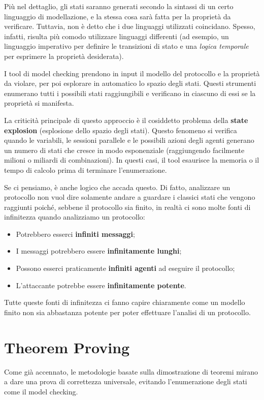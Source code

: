 Più nel dettaglio, gli stati saranno generati secondo la sintassi di un certo linguaggio di modellazione, e la stessa cosa sarà fatta per la proprietà da verificare. Tuttavia, non è detto che i due linguaggi utilizzati coincidano. Spesso, infatti, risulta più comodo utilizzare linguaggi differenti (ad esempio, un linguaggio imperativo per definire le transizioni di stato e una \textit{logica temporale} per esprimere la proprietà desiderata).

I tool di model checking prendono in input il modello del protocollo e la proprietà da violare, per poi esplorare in automatico lo spazio degli stati. Questi strumenti enumerano tutti i possibili stati raggiungibili e verificano in ciascuno di essi se la proprietà si manifesta. 

La criticità principale di questo approccio è il cosiddetto problema della \textbf{state explosion} (esplosione dello spazio degli stati). Questo fenomeno si verifica quando le variabili, le sessioni parallele e le possibili azioni degli agenti generano un numero di stati che cresce in modo esponenziale (raggiungendo facilmente milioni o miliardi di combinazioni). In questi casi, il tool esaurisce la memoria o il tempo di calcolo prima di terminare l'enumerazione.

Se ci pensiamo, è anche logico che accada questo. Di fatto, analizzare un protocollo non vuol dire solamente andare a guardare i classici stati che vengono raggiunti poiché, sebbene il protocollo sia finito, in realtà ci sono molte fonti di infinitezza quando analizziamo un protocollo:
\begin{itemize}
    \item Potrebbero esserci \textbf{infiniti messaggi};
    \item I messaggi potrebbero essere \textbf{infinitamente lunghi};
    \item Possono esserci praticamente \textbf{infiniti agenti} ad eseguire il protocollo;
    \item L'attaccante potrebbe essere \textbf{infinitamente potente}.
\end{itemize}
Tutte queste fonti di infinitezza ci fanno capire chiaramente come un modello finito non sia abbastanza potente per poter effettuare l'analisi di un protocollo.
\section{Theorem Proving}
Come già accennato, le metodologie basate sulla dimostrazione di teoremi mirano a dare una prova di correttezza universale, evitando l'enumerazione degli stati come il model checking. 

